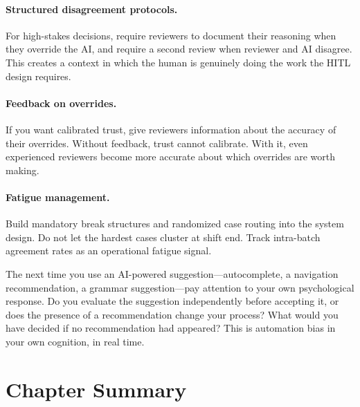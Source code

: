 \paragraph{Structured disagreement protocols.} For high-stakes decisions, require reviewers to document their reasoning when they override the AI, and require a second review when reviewer and AI disagree. This creates a context in which the human is genuinely doing the work the HITL design requires.

\paragraph{Feedback on overrides.} If you want calibrated trust, give reviewers information about the accuracy of their overrides. Without feedback, trust cannot calibrate. With it, even experienced reviewers become more accurate about which overrides are worth making.

\paragraph{Fatigue management.} Build mandatory break structures and randomized case routing into the system design. Do not let the hardest cases cluster at shift end. Track intra-batch agreement rates as an operational fatigue signal.

\begin{trythis}
The next time you use an AI-powered suggestion---autocomplete, a navigation recommendation, a grammar suggestion---pay attention to your own psychological response. Do you evaluate the suggestion independently before accepting it, or does the presence of a recommendation change your process? What would you have decided if no recommendation had appeared? This is automation bias in your own cognition, in real time.
\end{trythis}

\section*{Chapter Summary}

